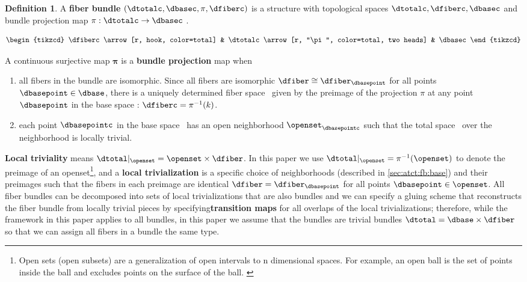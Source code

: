 \documentclass[review]{vgtc}
\theoremstyle{definition}
\newtheorem{definition}{Definition}[section]
\theoremstyle{remark}
\begin{document}
\begin{definition}\label{def:fiber_bundle}
   A \textbf{fiber bundle} $(\dtotalc, \dbasec, \pi, \dfiberc)$ is a structure with topological spaces $\dtotalc, \dfiberc, \dbasec$ and  bundle projection map $\pi: \dtotalc \rightarrow \dbasec$ \cite{spanier1989algebraic}.

   \begin{equation} \label{eq:atct:fb:intro}
    \begin{tikzcd}
      \dfiberc \arrow[r, hook, color=total] & \dtotalc \arrow[r, "\pi", color=total, two heads] & \dbasec
      \end{tikzcd}
    \end{equation}

A continuous surjective map $\bm{\pi}$ is a \textbf{bundle projection} map when
\begin{enumerate}
  \item all fibers in the bundle are isomorphic. Since all fibers are isomorphic $\dfiber \cong \dfiber_{\dbasepoint}$ for all points $\dbasepoint \in \dbase$, there is a uniquely determined \textcolor{fiber}{fiber space} \dfiberc\ given by the preimage of the projection $\pi$ at any point $\dbasepoint$ in the \textcolor{base}{base space} \dbasec: $\dfiberc = \pi^{-1}(k)$.
  \item each point $\dbasepointc$ in the \textcolor{base}{base space} \dbasec\ has an open neighborhood $\openset_{\dbasepointc}$ such that the \textcolor{total}{total space} \dtotalc\ over the neighborhood is locally trivial.
\end{enumerate}
\end{definition}

\textbf{Local triviality} means $\dtotal\vert_{\openset} = \openset\times \dfiber$. In this paper we use $\dtotal\vert_{\openset} = \pi^{-1}(\openset)$ to denote the preimage of an openset\footnote{Open sets (open subsets) are a generalization of open intervals to n dimensional spaces. For example, an open ball is the set of points inside the ball and excludes points on the surface of the ball. \cite{weissteinOpenSet,bradleyTopologyVsTopology}}, and a \textbf{local trivialization} is a specific choice of neighborhoods (described in \autoref{sec:atct:fb:base}) and their preimages such that the fibers in each preimage are identical $\dfiber = \dfiber_{\dbasepoint}$ for all points $\dbasepoint \in \openset$. All fiber bundles can be decomposed into sets of local trivializations that are also bundles and we can specify a gluing scheme that reconstructs the fiber bundle from locally trivial pieces by specifying\textbf{transition maps} for all overlaps of the local trivializations; therefore, while the framework in this paper applies to all bundles, in this paper we assume that the bundles are trivial bundles $\dtotal = \dbase \times \dfiber$ so that we can assign all fibers in a bundle the same type.
\end{document}
